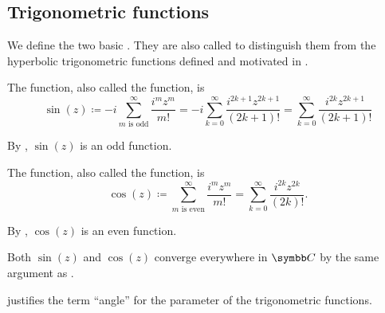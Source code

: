 \subsection{Trigonometric functions}\label{subsec:trigonometric_functions}

\begin{definition}\label{def:trigonometric_functions}
  We define the two basic . They are also called  to distinguish them from the hyperbolic trigonometric functions defined and motivated in .

  \begin{defenum}
     The  function, also called the  function, is
    \begin{equation*}
      \sin(z)
      \coloneqq
      -i \sum_{m \text{ is odd}}^\infty \frac {i^m z^m} {m!}
      =
      -i \sum_{k=0}^\infty \frac {i^{2k+1} z^{2k+1}} {(2k + 1)!}
      =
      \sum_{k=0}^\infty \frac {i^{2k} z^{2k+1}} {(2k + 1)!}
    \end{equation*}

    By , \( \sin(z) \) is an odd function.

     The  function, also called the  function, is
    \begin{equation*}
      \cos(z)
      \coloneqq
      \sum_{m \text{ is even}}^\infty \frac {i^m z^m} {m!}
      =
      \sum_{k=0}^\infty \frac {i^{2k} z^{2k}} {(2k)!}.
    \end{equation*}

    By , \( \cos(z) \) is an even function.
  \end{defenum}

  Both \( \sin(z) \) and \( \cos(z) \) converge everywhere in \( \BC \) by the same argument as .

   justifies the term \enquote{angle} for the parameter of the trigonometric functions.
\end{definition}

